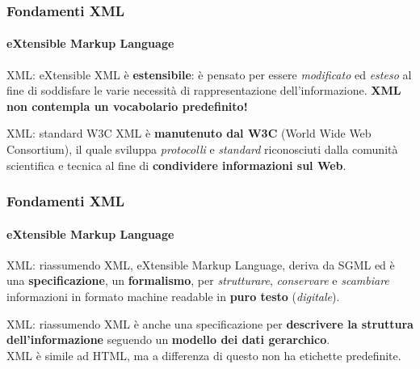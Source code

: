 \begin{frame}
	\frametitle{Fondamenti XML}
	\framesubtitle{eXtensible Markup Language}
	\addtocounter{nframe}{1}

	\begin{block}{XML: eXtensible}
		XML è \textbf{estensibile}: è pensato per essere \textit{modificato} ed \textit{esteso} al fine di soddisfare le varie necessità di rappresentazione dell'informazione.
		\textbf{XML non contempla un vocabolario predefinito!}
	\end{block}

	\begin{block} {XML: standard W3C}
		XML è \textbf{manutenuto dal W3C} (World Wide Web Consortium), il quale sviluppa \textit{protocolli} e \textit{standard} riconosciuti dalla comunità scientifica e tecnica al fine di \textbf{condividere informazioni sul Web}.
	\end{block}
\end{frame}

\begin{frame}
	\frametitle{Fondamenti XML}
	\framesubtitle{eXtensible Markup Language}
	\addtocounter{nframe}{1}

	\begin{block}{XML: riassumendo}
		XML, eXtensible Markup Language, deriva da SGML ed 
		è una \textbf{specificazione}, un \textbf{formalismo}, per \textit{strutturare}, \textit{conservare} e \textit{scambiare} informazioni in formato machine readable in \textbf{puro testo} (\textit{digitale}).
	\end{block}

	\begin{block}{XML: riassumendo}
		XML è anche una specificazione per \textbf{descrivere la struttura dell'informazione} seguendo un \textbf{modello dei dati gerarchico}.
		\\ XML è simile ad HTML, ma a differenza di questo non ha etichette predefinite.
	\end{block}

\end{frame}


